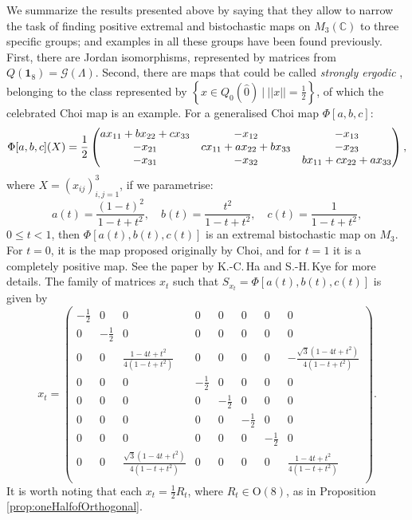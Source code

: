 \documentclass[12pt]{article}
\theoremstyle{plain}
\theoremstyle{definition}
\theoremstyle{remark}
\numberwithin{equation}{section}
\begin{document}
We summarize the results presented above by saying that they allow
to narrow the task of finding positive extremal and bistochastic maps
on $M_{3}(\mathbb{C})$ to three specific groups;
and examples in all these groups have been found previously.
First, there are Jordan isomorphisms, represented by matrices from
$Q(\mathbf{1}_{8}) = \mathcal{G}(\Lambda)$.
Second, there are maps that could be called \emph{strongly ergodic}
\cite{miller2015stable},
belonging to the class represented by
$\left \{ x \in Q_{0}(\hat{0}) \:|\: ||x|| = \frac{1}{2} \right \}$,
of which the celebrated Choi map
\cite{choi1977extremal} is an example.
For a generalised Choi map $\Phi[a,b,c]$:
\begin{equation}\label{eq:choi}
\Phi[a,b,c](X)=\\ 
\frac{1}{2}
\begin{pmatrix}
ax_{11}+bx_{22}+cx_{33} & -x_{12} & -x_{13} \\
-x_{21} & cx_{11}+ax_{22}+bx_{33} & -x_{23} \\
-x_{31} & -x_{32} & bx_{11}+cx_{22}+ax_{33}
\end{pmatrix},
\end{equation}
where $X = (x_{ij})_{i,j = 1}^{3}$,
if we parametrise:
\begin{equation}
a(t)=\dfrac{(1-t)^2}{1-t+t^2},\quad b(t)=\dfrac{t^2}{1-t+t^2},\quad c(t)=\dfrac 1{1-t+t^2},
\end{equation}
$0 \leq t < 1$,
then $\Phi[a(t), b(t), c(t)]$ is an extremal bistochastic map on $M_{3}$.
For $t = 0$, it is the map proposed originally by Choi,
and for $t = 1$ it is a completely positive map.
See the paper by 
K.-C.\,Ha and S.-H.\,Kye \cite{ha2011entanglement} for more details.
The family of matrices $x_{t}$ such that
$S_{x_{t}} = \Phi[a(t), b(t), c(t)]$ is given by
\begin{equation}
    x_{t} = \begin{pmatrix}
        - \frac{1}{2} & 0 & 0 & 0 & 0 & 0 & 0 & 0 \\  
        0 & - \frac{1}{2} & 0 & 0 & 0 & 0 & 0 & 0 \\
        0 & 0 & \frac{1 - 4t + t^{2}}{4(1 - t + t^{2})} & 0 & 0 & 0 & 0 & - \frac{\sqrt{3}(1 - 4t + t^{2})}{4(1 - t + t^{2})} \\
        0 & 0 & 0 & - \frac{1}{2} & 0 & 0 & 0 & 0 \\
        0 & 0 & 0 & 0 & - \frac{1}{2} & 0 & 0 & 0 \\
        0 & 0 & 0 & 0 & 0 & - \frac{1}{2} & 0 & 0 \\  
        0 & 0 & 0 & 0 & 0 & 0 & - \frac{1}{2} & 0 \\  
        0 & 0 & \frac{\sqrt{3}(1 - 4t + t^{2})}{4(1 - t + t^{2})} & 0 & 0 & 0 & 0 & \frac{1 - 4t + t^{2}}{4(1 - t + t^{2})} \\
    \end{pmatrix}.
\end{equation}
It is worth noting that each
$x_{t} = \frac{1}{2} R_{t}$, where $R_{t} \in \text{O}(8)$,
as in Proposition \ref{prop:oneHalfofOrthogonal}.
\end{document}
